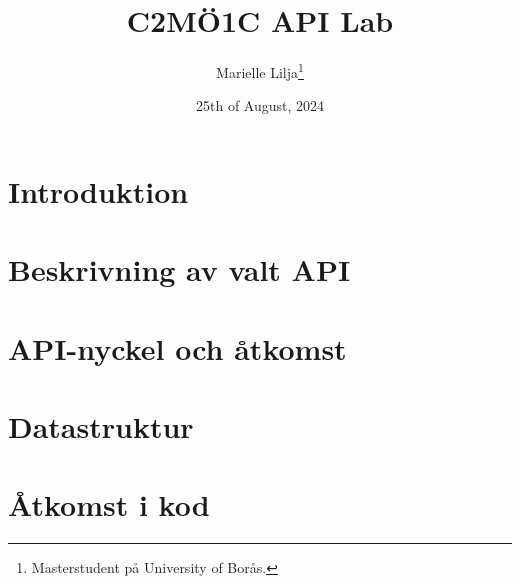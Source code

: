 \documentclass[12pt, letterpaper]{article}
\title{C2MÖ1C API Lab}
\author{Marielle Lilja\thanks{Masterstudent på University of Borås.}}
\date{25th of August, 2024}
\begin{document}
\maketitle

\tableofcontents

\section{Introduktion}

\section{Beskrivning av valt API}

\section{API-nyckel och åtkomst}

\section{Datastruktur}

\section{Åtkomst i kod}
\end{document}
